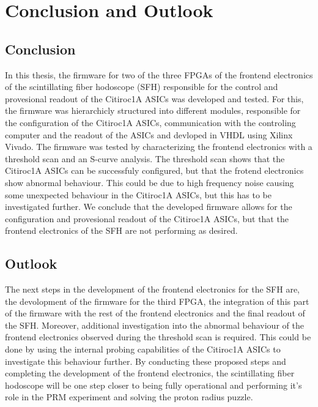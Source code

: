 \chapter{Conclusion and Outlook}
\section{Conclusion}
In this thesis, the firmware for two of the three FPGAs of the frontend electronics of the scintillating fiber hodoscope (SFH) responsible for the control and provesional readout of the Citiroc1A ASICs was developed and tested.
For this, the firmware was hierarchicly structured into different modules, responsible for the configuration of the Citiroc1A ASICs, communication with the controling computer and the readout of the ASICs and devloped in VHDL using Xilinx Vivado.
The firmware was tested by characterizing the frontend electronics with a threshold scan and an S-curve analysis.
The threshold scan shows that the Citiroc1A ASICs can be successfuly configured, but that the frotend electronics show abnormal behaviour.
This could be due to high frequency noise causing some unexpected behaviour in the Citiroc1A ASICs, but this has to be investigated further.
We conclude that the developed firmware allows for the configuration and provesional readout of the Citiroc1A ASICs, 
but that the frontend electronics of the SFH are not performing as desired.

\section{Outlook}
The next steps in the development of the frontend electronics for the SFH are, the devolopment of the firmware for the third FPGA,
the integration of this part of the firmware with the rest of the frontend electronics and the final readout of the SFH.
Moreover, additional investigation into the abnormal behaviour of the frontend electronics observed during the threshold scan is required.
This could be done by using the internal probing capabilities of the Citiroc1A ASICs to investigate this behaviour further.
\newline
By conducting these proposed steps and completing the development of the frontend electronics,
the scintillating fiber hodoscope will be one step closer to being fully operational and performing it's role in the PRM experiment and solving the proton radius puzzle.
